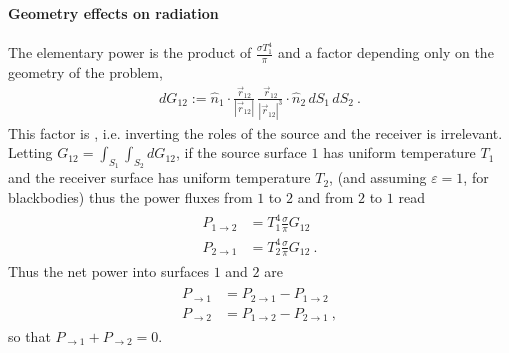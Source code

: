 \documentclass[letterpaper,10pt,english]{jupyterBook}
\begin{document}
\paragraph{Geometry effects on radiation}
\label{\detokenize{ch/heat-transfer-radiation:geometry-effects-on-radiation}}\label{\detokenize{ch/heat-transfer-radiation:classical-thermodynamics-heat-transmission-radiation-stefan-boltzmann-geometry}}
\sphinxAtStartPar
The elementary power is the product of \(\frac{\sigma T_1^4}{\pi}\) and a factor depending only on the geometry of the problem,
\begin{equation*}
\begin{split}d G_{12} := \hat{n}_1 \cdot \frac{\vec{r}_{12}}{|\vec{r}_{12}|} \, \frac{\vec{r}_{12}}{|\vec{r}_{12}|^3} \cdot \hat{n}_2 \, dS_1 \, dS_2 \ .\end{split}
\end{equation*}
\sphinxAtStartPar
This factor is , i.e. inverting the roles of the source and the receiver is irrelevant. Letting \(G_{12} = \int_{S_1} \int_{S_2} dG_{12}\), if the source surface \(1\) has uniform temperature \(T_1\) and the receiver surface has uniform temperature \(T_2\), (and assuming {\hyperref[\detokenize{ch/heat-transfer-radiation:classical-thermodynamics-heat-transmission-radiation-emittivity}]{}} \(\varepsilon = 1\), for black\sphinxhyphen{}bodies) thus the power fluxes from \(1\) to \(2\) and from \(2\) to \(1\) read
\begin{equation*}
\begin{split}\begin{aligned}
  P_{1 \rightarrow 2} & = T_1^4 \frac{\sigma}{\pi} G_{12} \\
  P_{2 \rightarrow 1} & = T_2^4 \frac{\sigma}{\pi} G_{12} \ .
\end{aligned}\end{split}
\end{equation*}
\sphinxAtStartPar
Thus the net power into surfaces \(1\) and \(2\) are
\begin{equation*}
\begin{split}\begin{aligned}
  P_{\rightarrow 1} & = P_{2 \rightarrow 1} - P_{1 \rightarrow 2} \\
  P_{\rightarrow 2} & = P_{1 \rightarrow 2} - P_{2 \rightarrow 1} \ ,
\end{aligned}\end{split}
\end{equation*}
\sphinxAtStartPar
so that \(P_{\rightarrow 1} + P_{\rightarrow 2} = 0\).
\end{document}

